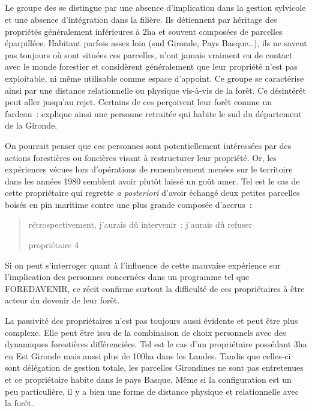 \documentclass[12pt]{report}
\newcounter{table1}
\begin{document}
\subsection{}

Le groupe des  se distingue par une absence d’implication
dans la gestion sylvicole et une absence d’intégration dans la filière. Ils
détiennent par héritage des propriétés généralement inférieures à 2ha et souvent
composées de parcelles éparpillées. Habitant parfois assez loin (sud Gironde,
Pays Basque\ldots{}), ils ne savent pas toujours où sont situées ces parcelles, n’ont
jamais vraiment eu de contact avec le monde forestier et considèrent
généralement que leur propriété n’est pas exploitable, ni même utilisable comme
espace d’appoint. Ce groupe se caractérise ainsi par une distance relationnelle
ou physique vis-à-vis de la forêt. Ce désintérêt peut aller jusqu’au rejet.
Certains de ces  perçoivent leur forêt comme
un fardeau~:  explique ainsi une
personne retraitée qui habite le sud du département de la Gironde.

On pourrait penser que ces personnes sont potentiellement intéressées par des
actions forestières ou foncières visant à restructurer leur propriété. Or, les
expériences vécues lors d’opérations de remembrement menées sur le territoire
dans les années 1980  semblent avoir plutôt laissé un goût amer. Tel est le cas
de cette propriétaire qui regrette \textit{a posteriori} d’avoir échangé deux petites
parcelles boisés en pin maritime contre une plus grande composée d’accrus~:
\blockquote[propriétaire 4]{rétrospectivement, j’aurais dû intervenir~; j’aurais dû refuser}
Si on peut s’interroger quant à l’influence de cette mauvaise expérience  sur
l’implication des personnes concernées dans un programme tel que FOREDAVENIR,
ce récit confirme surtout la difficulté de ces propriétaires à être acteur du
devenir de leur forêt.

La passivité des propriétaires n’est pas toujours aussi évidente et peut être
plus complexe. Elle peut être issu de la combinaison de choix personnels avec
des dynamiques forestières différenciées. Tel est le cas  d’un
propriétaire possédant 3ha en Est Gironde mais aussi plus de 100ha dans les
Landes. Tandis que celles-ci sont délégation de gestion totale, les parcelles
Girondines ne sont pas entretenues et ce propriétaire habite dans le pays Basque.
Même si la configuration est un peu particulière, il y a bien une forme de
distance physique et relationnelle avec la forêt.
\end{document}
